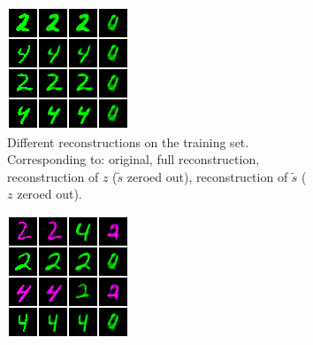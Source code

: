 \begin{figure}[tp]
  \centering
  \begin{subfigure}[b]{0.49\columnwidth}
    \centering
    \includegraphics[width=\textwidth]{supmatch/example_images/zany-glade-2191_train_reconstructions_9900.png}
    \caption{
    Different reconstructions on the training set. Corresponding to: original, full reconstruction,
    reconstruction of $z$ ($\tilde{s}$ zeroed out), reconstruction of $\tilde{s}$ ($z$ zeroed out).
    }%
    \label{fig:cmnist-recon-training-failure}
  \end{subfigure}
   \hfill
  \begin{subfigure}[b]{0.49\columnwidth}
    \centering
    \includegraphics[width=\textwidth]{supmatch/example_images/zany-glade-2191_context_reconstructions_9900.png}

\end{subfigure}
\end{figure}
